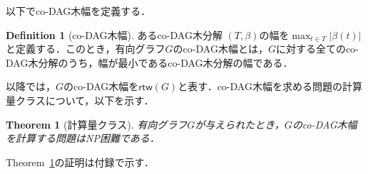 \documentclass[master]{kuisthesis}		%
\theoremstyle{plain}
\newtheorem{theorem}{Theorem}
\theoremstyle{definition}
\newtheorem{definition*}{Definition}
\begin{document}
以下でco-DAG木幅を定義する．

\begin{definition*}[co-DAG木幅]
    あるco-DAG木分解 $(T, \beta)$の幅を$\max_{t \in T}|\beta(t)|$と定義する．このとき，有向グラフ$G$のco-DAG木幅とは，$G$に対する全てのco-DAG木分解のうち，幅が最小であるco-DAG木分解の幅である．
\end{definition*}

以降では，$G$のco-DAG木幅を$\mathsf{rtw}(G)$と表す．co-DAG木幅を求める問題の計算量クラスについて，以下を示す．


\begin{theorem}[計算量クラス]\label{r-NP困難}
    有向グラフ$G$が与えられたとき，$G$のco-DAG木幅を計算する問題はNP困難である．
\end{theorem}

Theorem~\ref{r-NP困難}の証明は付録で示す．
\end{document}
